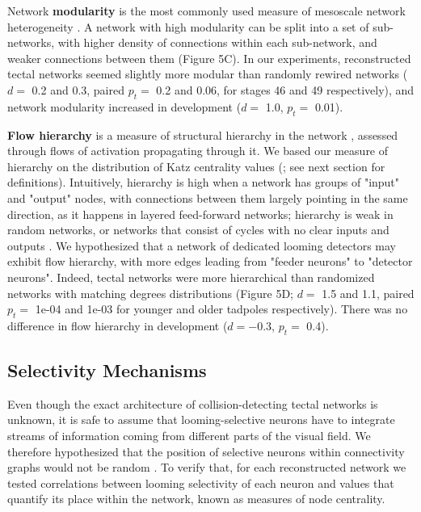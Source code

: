 \documentclass{article}
\begin{document}
Network \textbf{modularity} is the most commonly used measure of mesoscale network heterogeneity \citep{newman2006modularity, leicht2008community}. A network with high modularity can be split into a set of sub-networks, with higher density of connections within each sub-network, and weaker connections between them (Figure 5C). In our experiments, reconstructed tectal networks seemed slightly more modular than randomly rewired networks ($d=$ 0.2 and 0.3, paired $p_t=$ 0.2 and 0.06, for stages 46 and 49 respectively), and network modularity increased in development ($d=$ 1.0, $p_t =$ 0.01).

\textbf{Flow hierarchy} is a measure of structural hierarchy in the network \citep{mones2012hierarchy}, assessed through flows of activation propagating through it. We based our measure of hierarchy on the distribution of Katz centrality values (\citealt{katz1953original, fletcher2018katz}; see next section for definitions). Intuitively, hierarchy is high when a network has groups of "input" and "output" nodes, with connections between them largely pointing in the same direction, as it happens in layered feed-forward networks; hierarchy is weak in random networks, or networks that consist of cycles with no clear inputs and outputs \citep{czegel2015hierarchy}. We hypothesized that a network of dedicated looming detectors may exhibit flow hierarchy, with more edges leading from "feeder neurons" to "detector neurons". Indeed, tectal networks were more hierarchical than randomized networks with matching degrees distributions (Figure 5D; $d=$ 1.5 and 1.1, paired $p_t=$ 1e-04 and 1e-03 for younger and older tadpoles respectively). There was no difference in flow hierarchy in development ($d=-$0.3, $p_t=$ 0.4).

\subsection*{Selectivity Mechanisms}

Even though the exact architecture of collision-detecting tectal networks is unknown, it is safe to assume that looming-selective neurons have to integrate streams of information coming from different parts of the visual field. We therefore hypothesized that the position of selective neurons within connectivity graphs would not be random \citep{timme2016degree}. To verify that, for each reconstructed network we tested correlations between looming selectivity of each neuron and values that quantify its place within the network, known as measures of node centrality.
\end{document}
